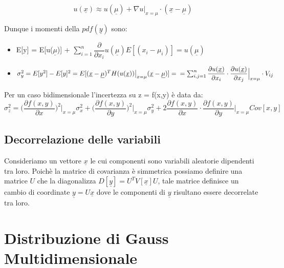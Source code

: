 \begin{equation*}
	u(\underline{x}) \approx u(\underline{\mu})+ \nabla u\big \vert_{x = \mu}\cdot (\underline{x} - \underline{\mu})
\end{equation*}

\noindent Dunque i momenti della $pdf(\underline{y})$ sono:

\begin{itemize}
	\item E[y] = E[u($\underline{\mu}$)] + $\sum_{i =1}^{n} \dfrac{\partial}{\partial x_{i}}u(\underline{\mu})E[(x_i - \mu_{i})] = u(\underline{\mu}) $
	\item $\sigma_y^2 = E[y^2] - E[y]^2 = E[ (\underline{x} - \underline{\mu})^T H(u(\underline{x}))\big \vert_{x = \mu}(\underline{x} - \underline{\mu})] = \\ \\ =\sum_{i,j =1}^n \dfrac{\partial u(\underline{x})}{\partial x_i} \cdot \dfrac{\partial u(\underline{x})}{\partial x_j}\Big \vert_{x = \mu} \cdot V_{ij}$
\end{itemize}
\vspace{0.1in}
\noindent Per un caso bidimensionale l'incertezza su z = f(x,y) \`{e} data da:
\vspace{0.05in}
\begin{equation}
	\sigma_{z}^2 = \Big (\dfrac{\partial f(x,y)}{\partial x}\Big)^2 \Big \vert_{x =\mu}  \sigma_x^2 + \Big (\dfrac{\partial f(x,y)}{\partial y}\Big)^2\Big \vert_{x =\mu}  \sigma_y^2 + 2 \dfrac{\partial f(x,y)}{\partial x} \cdot \dfrac{\partial f(x,y)}{\partial y}\Big \vert_{x =\mu} Cov[x,y]
\end{equation}
\newpage

\subsection{Decorrelazione delle variabili}

Consideriamo un vettore $\underline{x}$ le cui componenti sono variabili aleatorie dipendenti tra loro. Poich\`{e} la matrice di covarianza \`{e} simmetrica possiamo definire una matrice $U$ che la diagonalizza $D[\underline{y}] = U^T V[\underline{x}]U$, tale matrice definisce un cambio di coordinate $\underline{y} = U\underline{x}$ dove le componenti di $\underline{y}$ risultano essere decorrelate tra loro.

\section{Distribuzione di Gauss Multidimensionale}

